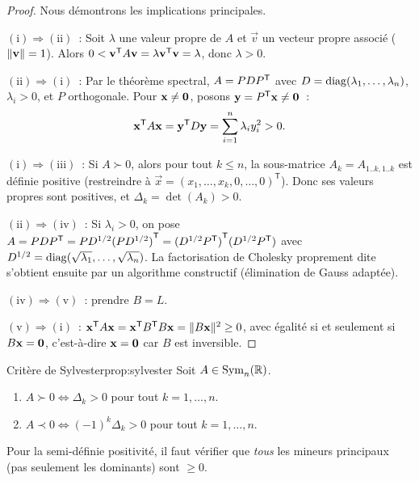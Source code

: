 \begin{proof}
  Nous démontrons les implications principales.

  \medskip
  $(\mathrm{i}) \Rightarrow (\mathrm{ii})$~:
  Soit $\lambda$ une valeur propre de $A$ et $\vec{v}$ un vecteur propre
  associé ($\lVert\mathbf{v}\rVert = 1$). Alors
  $0 < {\mathbf{v}}^{\mathsf{T}} A \mathbf{v} = \lambda {\mathbf{v}}^{\mathsf{T}} \mathbf{v}
  = \lambda$, donc $\lambda > 0$.

  \medskip
  $(\mathrm{ii}) \Rightarrow (\mathrm{i})$~:
  Par le théorème spectral, $A = P D {P}^{\mathsf{T}}$ avec $D = \operatorname{diag}(\lambda_1,
  \ldots, \lambda_n)$, $\lambda_i > 0$, et $P$ orthogonale. Pour
  $\mathbf{x} \neq \mathbf{0}$, posons $\mathbf{y} = {P}^{\mathsf{T}}\mathbf{x} \neq \mathbf{0}$~:
  \[
    {\mathbf{x}}^{\mathsf{T}} A \mathbf{x}
    = {\mathbf{y}}^{\mathsf{T}} D \mathbf{y}
    = \sum_{i=1}^{n} \lambda_i y_i^2 > 0.
  \]

  \medskip
  $(\mathrm{i}) \Rightarrow (\mathrm{iii})$~:
  Si $A \succ 0$, alors pour tout $k \leq n$, la sous-matrice
  $A_k = A_{1..k,1..k}$ est définie positive (restreindre à
  $\vec{x} = (x_1, \ldots, x_k, 0, \ldots, 0)^{\mathsf{T}}$). Donc
  ses valeurs propres sont positives, et $\Delta_k = \det(A_k) > 0$.

  \medskip
  $(\mathrm{ii}) \Rightarrow (\mathrm{iv})$~:
  Si $\lambda_i > 0$, on pose $A = P D {P}^{\mathsf{T}}
  = P D^{1/2} {(P D^{1/2})}^{\mathsf{T}} = {(D^{1/2}{P}^{\mathsf{T}})}^{\mathsf{T}}
  (D^{1/2}{P}^{\mathsf{T}})$ avec $D^{1/2} = \operatorname{diag}(\sqrt{\lambda_1}, \ldots,
  \sqrt{\lambda_n})$. La factorisation de Cholesky proprement dite
  s'obtient ensuite par un algorithme constructif (élimination de Gauss
  adaptée).

  \medskip
  $(\mathrm{iv}) \Rightarrow (\mathrm{v})$~: prendre $B = L$.

  \medskip
  $(\mathrm{v}) \Rightarrow (\mathrm{i})$~:
  ${\mathbf{x}}^{\mathsf{T}} A \mathbf{x} = {\mathbf{x}}^{\mathsf{T}} {B}^{\mathsf{T}} B \mathbf{x}
  = \lVert B\mathbf{x}\rVert^2 \geq 0$, avec égalité si et seulement si
  $B\mathbf{x} = \mathbf{0}$, c'est-à-dire $\mathbf{x} = \mathbf{0}$ car $B$ est
  inversible.
\end{proof}

\begin{proposition}{Critère de Sylvester}{prop:sylvester}
  Soit $A \in \operatorname{Sym}_n({\mathbb{R}})$.
  \begin{enumerate}[label=(\roman*)]
    \item $A \succ 0 \iff \Delta_k > 0$ pour tout $k = 1, \ldots, n$.
    \item $A \prec 0 \iff (-1)^k \Delta_k > 0$ pour tout $k = 1, \ldots, n$.
  \end{enumerate}
  Pour la semi-définie positivité, il faut vérifier que \emph{tous} les
  mineurs principaux (pas seulement les dominants) sont $\geq 0$.
\end{proposition}

